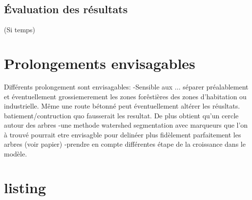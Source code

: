 \documentclass{article}
\begin{document}
	\subsection{\'{E}valuation des résultats} (Si temps)


\section{Prolongements envisagables}

	Différents prolongement sont envisagables: 
	-Sensible aux ... séparer préalablement et éventuellement grossiemerement les zones forêstières des zones d'habitation ou  industrielle. Même une route bétonné peut éventuellement altérer les réusltats. batiement/contruction quo fausserait les resultat. 
	De plus obtient qu'un cercle autour des arbres
	-une methode watershed segmentation avec marqueurs que l'on à trouvé pourrait etre envisagble pour delinéer plus fidèlement parfaitement les arbres (voir papier) 
	-prendre en compte différentes étape de la croissance dans le modèle. 
	
\nocite{NatesanResNet} %



\appendix
	\centering
	\newpage
	\section{listing}
	\begin{flushleft}
	[breaklines=true]
	\end{flushleft}
	\newpage
\end{document}
